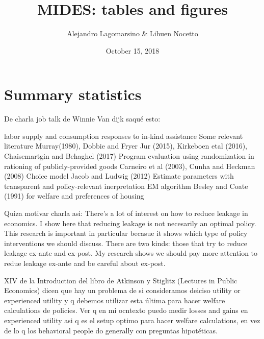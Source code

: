 \documentclass[12pt]{article}
\title{MIDES: tables and figures}
\author{Alejandro Lagomarsino \& Lihuen Nocetto}
\date{October 15, 2018}
\begin{document}
	
	\maketitle	
	
	\section{Summary statistics}

De charla job talk de Winnie Van dijk saqué esto:

labor supply and consumption responses to in-kind assistance 
Some relevant literature Murray(1980), Dobbie and Fryer Jur (2015), Kirkeboen etal (2016), Chaisemartgin and Behaghel (2017)
Program evaluation using randomization in rationing of publicly-provided goods
Carneiro et al (2003), Cunha and Heckman (2008)
Choice model
Jacob and Ludwig (2012)
Estimate parameters with transparent and policy-relevant inerpretation
EM algorithm
Besley and Coate (1991) for welfare and preferences of housing


Quiza motivar charla asi: There's a lot of interest on how to reduce leakage in economics. I show here that reducing leakage is not necesarily an optimal policy. This research is important in particular becasue it shows which type of policy interventions we should discuss. There are two kinds: those that try to reduce leakage ex-ante and ex-post. My research shows we should pay more attention to redue leakage ex-ante and be careful about ex-post.

XIV de la Introduction del libro de Atkinson y Stiglitz (Lectures in Public Economics) dicen que hay un problema de si consideramos deiciso utility or experienced utility y q debemos utilizar esta última para hacer welfare calculations de policies. Ver q en mi ocntexto puedo medir losses and gains en experienced utility asi q es el setup optimo para hacer welfare calculations, en vez de lo q los behavioral people do generally con preguntas hipotéticas.
\end{document}
